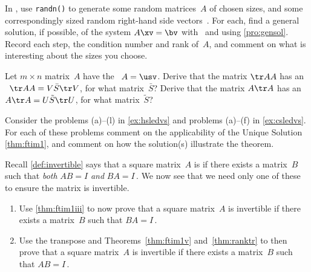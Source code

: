 \begin{exercise} \label{ex:} 
In \script, use \verb|randn()| to generate some random matrices~\(A\) of chosen sizes, and some correspondingly sized random right-hand side vectors~\bv.
For each, find a general solution, if possible, of the system \(A\xv=\bv\) with \script\ and using \autoref{pro:gensol}.
Record each step, the condition number and rank of~\(A\), and comment on what is interesting about the sizes you choose.
\end{exercise}


\begin{exercise} \label{ex:svdtrAA} 
Let \(m\times n\) matrix~\(A\) have the \svd\ \(A=\usv\).
Derive that the matrix \(\tr AA\) has an \svd\ \(\tr AA=V\bar S\tr V\), for what matrix~\(\bar S\)?
Derive that the matrix \(A\tr A\) has an \svd\ \(A\tr A=U\tilde S\tr U\), for what matrix~\(\tilde S\)?
\end{exercise}




\begin{exercise} \label{ex:} 
Consider the problems (a)--(l) in \autoref{ex:hsledvs} and problems (a)--(f) in \autoref{ex:csledvs}.
For each of these problems comment on the applicability of the Unique Solution \autoref{thm:ftim1}, and comment on how the solution(s) illustrate the theorem.
\end{exercise}



\begin{exercise} \label{ex:} 
Recall \autoref{def:invertible} says that a square matrix~\(A\) is  if there exists a matrix~\(B\) such that \emph{both} \(AB=I\) \emph{and} \(BA=I\)\,.
We now see that we need only one of these to ensure the matrix is invertible.
\begin{enumerate}
\item Use \autoref{thm:ftim1iii} to now prove that a square matrix~\(A\) is invertible if there exists a matrix~\(B\) such that \(BA=I\)\,.

\item Use the transpose and Theorems~\ref{thm:ftim1v} and~\ref{thm:ranktr} to then prove that a square matrix~\(A\) is invertible if there exists a matrix~\(B\) such that \(AB=I\)\,.
\end{enumerate}
\end{exercise}




